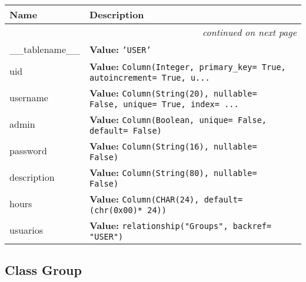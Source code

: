     \vspace{-1cm}
\hspace{\varindent}\begin{longtable}{|p{\varnamewidth}|p{\vardescrwidth}|l}
\cline{1-2}
\cline{1-2} \centering \textbf{Name} & \centering \textbf{Description}& \\
\cline{1-2}
\endhead\cline{1-2}\multicolumn{3}{r}{\small\textit{continued on next page}}\\\endfoot\cline{1-2}
\endlastfoot\raggedright \_\-\_\-t\-a\-b\-l\-e\-n\-a\-m\-e\-\_\-\_\- & \raggedright \textbf{Value:} 
{\tt 'USER'}&\\
\cline{1-2}
\raggedright u\-i\-d\- & \raggedright \textbf{Value:} 
{\tt Column(Integer, primary\_key= True, autoincrement= True, u\texttt{...}}&\\
\cline{1-2}
\raggedright u\-s\-e\-r\-n\-a\-m\-e\- & \raggedright \textbf{Value:} 
{\tt Column(String(20), nullable= False, unique= True, index= \texttt{...}}&\\
\cline{1-2}
\raggedright a\-d\-m\-i\-n\- & \raggedright \textbf{Value:} 
{\tt Column(Boolean, unique= False, default= False)}&\\
\cline{1-2}
\raggedright p\-a\-s\-s\-w\-o\-r\-d\- & \raggedright \textbf{Value:} 
{\tt Column(String(16), nullable= False)}&\\
\cline{1-2}
\raggedright d\-e\-s\-c\-r\-i\-p\-t\-i\-o\-n\- & \raggedright \textbf{Value:} 
{\tt Column(String(80), nullable= False)}&\\
\cline{1-2}
\raggedright h\-o\-u\-r\-s\- & \raggedright \textbf{Value:} 
{\tt Column(CHAR(24), default= (chr(0x00)* 24))}&\\
\cline{1-2}
\raggedright u\-s\-u\-a\-r\-i\-o\-s\- & \raggedright \textbf{Value:} 
{\tt relationship("Groups", backref= "USER")}&\\
\cline{1-2}
\end{longtable}



\subsection{Class Group}

